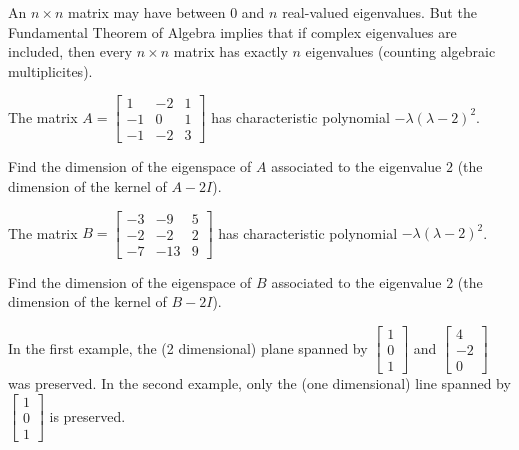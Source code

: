 \begin{applicationActivities}
\begin{observation}
  An \(n\times n\) matrix may have  between \(0\) and \(n\)
  real-valued eigenvalues. But the Fundamental Theorem of Algebra implies that if complex eigenvalues are included,
  then every \(n\times n\) matrix has exactly \(n\) eigenvalues (counting
  algebraic multiplicites).



\end{observation}

\begin{activity}{5}
  The matrix
  $A=\begin{bmatrix} 1 & -2 & 1 \\ -1 & 0 & 1 \\ -1 & -2 & 3\end{bmatrix}$
  has characteristic polynomial \(-\lambda(\lambda-2)^2\).

  Find the dimension of the eigenspace of $A$ associated to the
  eigenvalue $2$ (the dimension of the kernel of \(A-2I\)).
\end{activity}

\begin{activity}{5}
  The matrix
  $B=\begin{bmatrix} -3 & -9 & 5 \\ -2 & -2 & 2 \\ -7 & -13 & 9 \end{bmatrix}$
  has characteristic polynomial \(-\lambda(\lambda-2)^2\).

  Find the dimension of the eigenspace of $B$ associated to the
  eigenvalue $2$ (the dimension of the kernel of \(B-2I\)).
\end{activity}

\begin{observation}
In the first example, the (2 dimensional) plane spanned by $\begin{bmatrix} 1 \\ 0 \\ 1\end{bmatrix}$ and $\begin{bmatrix} 4 \\ -2 \\ 0 \end{bmatrix}$ was preserved.  In the second example, only the (one dimensional) line spanned by $\begin{bmatrix} 1 \\ 0 \\ 1\end{bmatrix}$ is preserved.
\end{observation}


\end{applicationActivities}
